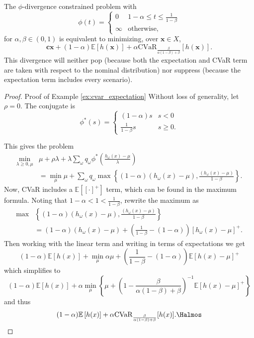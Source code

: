 \documentclass[12pt]{article}
\newcommand{\E}{\mathbb{E}}
\newcommand{\e}[1]{\E \left[ #1 \right]}
\newcommand{\x}{\mathbf{x}}
\renewcommand{\c}{\mathbf{c}}
\theoremstyle{plain}
\theoremstyle{definition}
\theoremstyle{remark}
\begin{document}
\begin{example}
	\label{ex:cvar_expectation}
	The $\phi$-divergence constrained problem with
	\[
		\phi(t) = 
		\begin{cases}
			0 & 1-\alpha \leq t \leq \frac{1}{1-\beta} \\
			\infty & \text{otherwise},
		\end{cases}
	\]
	for $\alpha,\beta \in (0,1)$ is equivalent to minimizing, over $\x \in X$,
	\[
		\c\x + (1-\alpha)\e{h(\x)} + \alpha \mbox{CVaR}_{\frac{\beta}{\alpha(1-\beta)+\beta}}[h(\x)].
	\]
	This divergence will neither pop (because both the expectation and CVaR term are taken with respect to the nominal distribution) nor suppress (because the expectation term includes every scenario).
\end{example}

\begin{proof}{\sc Proof of Example \ref{ex:cvar_expectation}}
	Without loss of generality, let $\rho = 0$.
	The conjugate is
	\[
		\phi^*(s) =
		\begin{cases}
			(1-\alpha) s & s < 0 \\
			\frac{1}{1-\beta} s & s \geq 0.
		\end{cases}
	\]
	
	This gives the problem
	\begin{align*}
		\min_{\lambda \geq 0,\mu} & \mu + \rho \lambda + \lambda \sum_\omega q_\omega \phi^*\left(\frac{h_\omega(x)-\mu}{\lambda}\right) \\
		& = \min_\mu \mu + \sum_\omega q_\omega \max \left\{ (1-\alpha)(h_\omega(x)-\mu), \frac{(h_\omega(x)-\mu)}{1-\beta} \right\}.
	\end{align*}
	Now, CVaR includes a $\e{[\cdot]^+}$ term, which can be found in the maximum formula.
	Noting that $1-\alpha < 1 < \frac{1}{1-\beta}$, rewrite the maximum as
	\begin{align*}
		\max & \left\{ (1-\alpha)(h_\omega(x)-\mu), \frac{(h_\omega(x)-\mu)}{1-\beta} \right\} \\
		& = (1-\alpha)(h_\omega(x)-\mu) + \left( \frac{1}{1-\beta} - (1-\alpha) \right) \left[ h_\omega(x)-\mu \right]^+.
	\end{align*}
	Then working with the linear term and writing in terms of expectations we get
	\[
		(1-\alpha)\e{h(x)} + \min_\mu \alpha\mu + \left( \frac{1}{1-\beta} - (1-\alpha) \right) \e{h(x)-\mu}^+
	\]
	which simplifies to
	\[
		(1-\alpha)\e{h(x)} + \alpha \min_\mu \left\{ \mu + \left(1 - \frac{\beta}{\alpha(1-\beta)+\beta}\right)^{-1} \e{h(x)-\mu}^+ \right\}
	\]
	and thus
	\[
		(1-\alpha)\e{h(x)} + \alpha \mbox{CVaR}_{\frac{\beta}{\alpha(1-\beta)+\beta}}[h(x)]. \Halmos
	\]
\end{proof}
\end{document}
